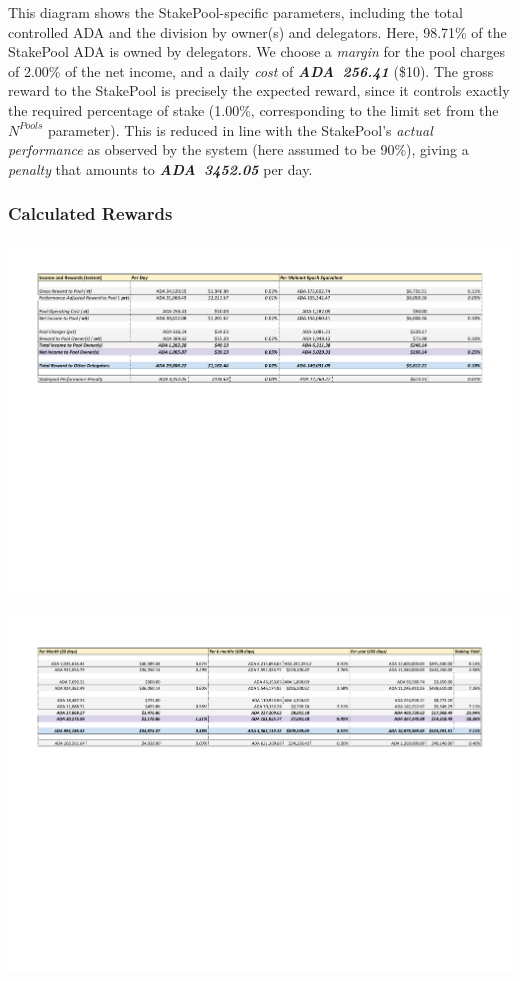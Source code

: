 \documentclass[11pt,a4paper,dvipsnames,twosided,final]{article}
\newcommand{\ada}{ADA{}}
\newcommand{\ADA}[1]{\textbf{\emph{\ada~{#1}}}}
\begin{document}
\noindent
This diagram shows the StakePool-specific parameters, including the total controlled \ada{} and the
division by owner(s) and delegators.  Here, 98.71\% of the StakePool \ada{} is owned
by delegators.  We choose a \emph{margin} for the pool charges of 2.00\% of the net income,
and a daily \emph{cost} of \ADA{256.41} (\$10).
The gross reward to the StakePool is precisely the expected reward, since it controls
exactly the required percentage of stake (1.00\%, corresponding to the limit set from
the $N^{\textit{Pools}}$ parameter).  This is reduced in line with the StakePool's \emph{actual performance}
as observed by the system (here assumed to be 90\%), giving a \emph{penalty} that amounts
to \ADA{3452.05} per day.

\clearpage
\subsubsection*{Calculated Rewards}

\hspace{-0.65in}\begin{minipage}{\textwidth}
  \includegraphics[width=1.2\textwidth]{RCT4.pdf}
\vspace{-3.8in}

\includegraphics[width=1.2\textwidth]{RCT5.pdf}
\vspace{-3in}
\end{minipage}
\end{document}
